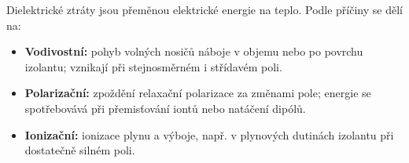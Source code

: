 Dielektrické ztráty jsou přeměnou elektrické energie na teplo. Podle příčiny se dělí na:
\begin{itemize}
\item \textbf{Vodivostní:} pohyb volných nosičů náboje v objemu nebo po povrchu izolantu; vznikají při stejnosměrném i střídavém poli.
\item \textbf{Polarizační:} zpoždění relaxační polarizace za změnami pole; energie se spotřebovává při přemisťování iontů nebo natáčení dipólů.
\item \textbf{Ionizační:} ionizace plynu a výboje, např. v plynových dutinách izolantu při dostatečně silném poli.
\end{itemize}
